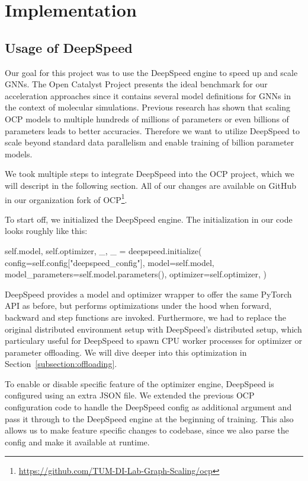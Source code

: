 \section{Implementation}
\label{section:implementation}

\subsection{Usage of DeepSpeed}

Our goal for this project was to use the DeepSpeed engine to speed up and scale 
GNNs. The Open Catalyst Project presents the ideal 
benchmark for our acceleration approaches since it contains several model definitions 
for GNNs in the context of molecular simulations. Previous research has shown 
that scaling OCP models to multiple hundreds of millions of parameters or even 
billions of parameters leads to better accuracies. Therefore we want to utilize 
DeepSpeed to scale beyond standard data parallelism and enable training of billion 
parameter models.

We took multiple steps to integrate DeepSpeed into the OCP project, which we will 
descript in the following section. All of our changes are available on GitHub in our 
organization fork of OCP\footnote{\url{https://github.com/TUM-DI-Lab-Graph-Scaling/ocp}}.

To start off, we initialized the DeepSpeed engine. 
The initialization in our code looks roughly like this:

\begin{python}
self.model, self.optimizer, _, _ = deepspeed.initialize(
    config=self.config["deepspeed_config"],
    model=self.model,
    model_parameters=self.model.parameters(),
    optimizer=self.optimizer,
)
\end{python}

DeepSpeed provides a model and optimizer wrapper to offer the same PyTorch API as 
before, but performs optimizations under the hood when forward, backward and step 
functions are invoked. Furthermore, we had to replace the original distributed 
environment setup with DeepSpeed's distributed setup, which particulary useful for 
DeepSpeed to spawn CPU worker processes for optimizer or parameter offloading. We 
will dive deeper into this optimization in Section~\ref{subsection:offloading}.

To enable or disable specific feature of the optimizer engine, DeepSpeed is 
configured using an extra JSON file. We extended the previous OCP configuration 
code to handle the DeepSpeed config as additional argument and pass it through 
to the DeepSpeed engine at the beginning of training. This also allows us to 
make feature specific changes to codebase, since we also parse the config and 
make it available at runtime.

